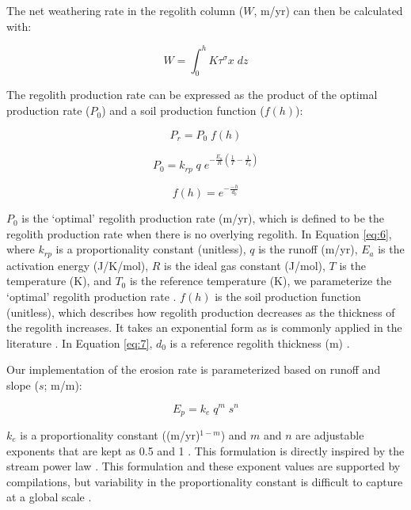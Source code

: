 \documentclass[9pt,twocolumn,twoside,lineno]{pnas-new}
\begin{document}
{The net weathering rate in the regolith column ($W$, m/yr) can then be calculated with:

\begin{equation}
    W = \int_{0}^{h} K \tau^{\sigma} x\;dz
    \label{eq:4}
\end{equation}

The regolith production rate can be expressed as the product of the optimal production rate ($P_{0}$) and a soil production function ($f(h)$):

\begin{equation}
    P_{r} = P_{0}\;f(h)
    \label{eq:5}
\end{equation}

\begin{equation}
    P_{0} = k_{rp}\;q\;e^{-\frac{E_{a}}{R}\left(\frac{1}{T}-\frac{1}{T_{0}}\right)}
    \label{eq:6}
\end{equation}

\begin{equation}
    f(h) = e^{-\frac{-h}{d_{0}}}
    \label{eq:7}
\end{equation}

\noindent
$P_{0}$ is the `optimal' regolith production rate (m/yr), which is defined to be the regolith production rate when there is no overlying regolith. In Equation \ref{eq:6}, where $k_{rp}$ is a proportionality constant (unitless), $q$ is the runoff (m/yr), $E_{a}$ is the activation energy (J/K/mol), $R$ is the ideal gas constant (J/mol), $T$ is the temperature (K), and $T_{0}$ is the reference temperature (K), we parameterize the `optimal' regolith production rate \cite{Carretier2014a}. $f(h)$ is the soil production function (unitless), which describes how regolith production decreases as the thickness of the regolith increases. It takes an exponential form as is commonly applied in the literature \cite{Gabet2009a}. In Equation \ref{eq:7}, $d_{0}$ is a reference regolith thickness (m) \cite{Heimsath1997a}.

Our implementation of the erosion rate is parameterized based on runoff and slope ($s$; m/m):

\begin{equation}
    E_{p} = k_{e}\;q^{m}\;s^{n}
    \label{eq:8}
\end{equation}

\noindent
$k_{e}$ is a proportionality constant ((m/yr)$^{1-m}$) and $m$ and $n$ are adjustable exponents that are kept as 0.5 and 1 \cite{Maffre2018a}. This formulation is directly inspired by the stream power law \cite{Davy2000a}. This formulation and these exponent values are supported by compilations, but variability in the proportionality constant is difficult to capture at a global scale \cite{Lague2013a}.

}
\end{document}
